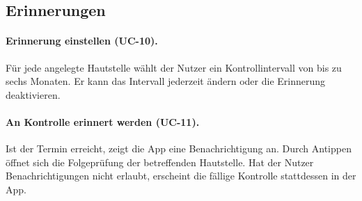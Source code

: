 \subsection{Erinnerungen}

\paragraph{Erinnerung einstellen (UC-10).} Für jede angelegte Hautstelle wählt der Nutzer ein Kontrollintervall von bis zu sechs Monaten. Er kann das Intervall jederzeit ändern oder die Erinnerung deaktivieren.

\paragraph{An Kontrolle erinnert werden (UC-11).} Ist der Termin erreicht, zeigt die App eine Benachrichtigung an. Durch Antippen öffnet sich die Folgeprüfung der betreffenden Hautstelle. Hat der Nutzer Benachrichtigungen nicht erlaubt, erscheint die fällige Kontrolle stattdessen in der App.
